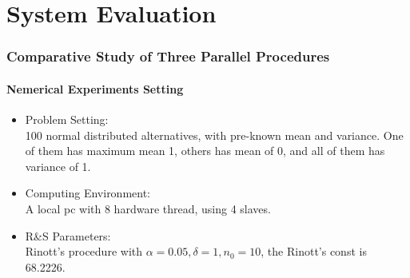 \documentclass{beamer}
\begin{document}

\section{System Evaluation}

\begin{frame}
\frametitle{Comparative Study of Three Parallel Procedures}
\framesubtitle{Nemerical Experiments Setting}
\begin{itemize}
\item {Problem Setting: } \\ 100 normal distributed alternatives, with pre-known mean and variance. One of them has maximum mean 1, others has mean of 0, and all of them has variance of 1.
\vspace{\baselineskip}
\item {Computing Environment: } \\ A local pc with 8 hardware thread, using 4 slaves.
\vspace{\baselineskip}
\item {R\&S Parameters: } \\ Rinott's procedure with $\alpha=0.05, \delta=1, n_0 = 10$, the Rinott's const is 68.2226.
\end{itemize}
\end{frame}
\end{document}
